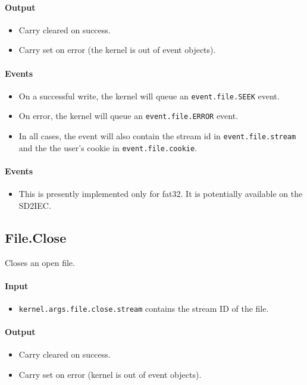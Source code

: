 \paragraph{Output}
\begin{itemize}
\item Carry cleared on success.
\item Carry set on error (the kernel is out of event objects).
\end{itemize}

\paragraph{Events}
\begin{itemize}
\item On a successful write, the kernel will queue an \verb+event.file.SEEK+ event.
\item On error, the kernel will queue an \verb+event.file.ERROR+ event.
\item In all cases, the event will also contain the stream id in \verb+event.file.stream+ and the the user's cookie in \verb+event.file.cookie+.
\end{itemize}

\paragraph{Events}
\begin{itemize}
\item This is presently implemented only for fat32.  It is potentially available on the SD2IEC.
\end{itemize}

\subsection*{File.Close}
Closes an open file.

\paragraph{Input}
\begin{itemize}
\item \verb+kernel.args.file.close.stream+ contains the stream ID of the file.
\end{itemize}

\paragraph{Output}
\begin{itemize}
\item Carry cleared on success.
\item Carry set on error (kernel is out of event objects).
\end{itemize}

